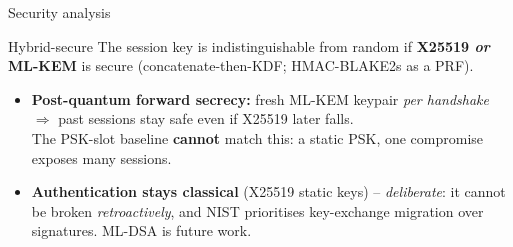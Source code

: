 \documentclass[aspectratio=169,11pt]{beamer}
\begin{document}
\begin{frame}{Security analysis}
  \begin{block}{Hybrid-secure}
    The session key is indistinguishable from random if \textbf{X25519
    \emph{or} ML-KEM} is secure (concatenate-then-KDF; HMAC-BLAKE2s as a PRF).
  \end{block}
  \begin{itemize}
    \item \textcolor{pqgood}{\textbf{Post-quantum forward secrecy:}} fresh ML-KEM
          keypair \emph{per handshake} $\Rightarrow$ past sessions stay safe even
          if X25519 later falls.
          \\ \small\color{pqgray} The PSK-slot baseline \textbf{cannot} match
          this: a static PSK, one compromise exposes many sessions.
    \item \textcolor{pqaccent}{\textbf{Authentication stays classical}} (X25519
          static keys) -- \emph{deliberate}: it cannot be broken
          \emph{retroactively}, and NIST prioritises key-exchange migration over
          signatures. ML-DSA is future work.
  \end{itemize}
\end{frame}
\end{document}
